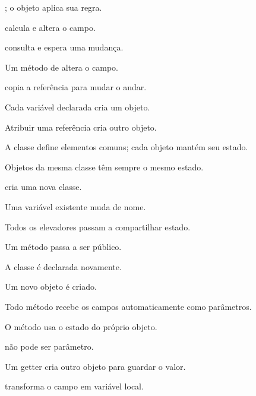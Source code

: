 \documentclass[11pt,a4paper]{article}
\begin{document}
\begin{minipage}[t]{.485\textwidth}
\begin{alternativas}
\item {}; o objeto aplica sua regra.
\item {} calcula e altera o campo.
\item {} consulta e espera uma mudança.
\item Um método de  altera o campo.
\item {} copia a referência para mudar o andar.
\end{alternativas}
\begin{alternativas}
\item Cada variável declarada cria um objeto.
\item Atribuir uma referência cria outro objeto.
\item A classe define elementos comuns; cada objeto mantém seu estado.
\item Objetos da mesma classe têm sempre o mesmo estado.
\item {} cria uma nova classe.
\end{alternativas}
\begin{alternativas}
\item Uma variável existente muda de nome. \item Todos os elevadores passam a compartilhar estado.
\item Um método passa a ser público. \item A classe é declarada novamente.
\item Um novo objeto  é criado.
\end{alternativas}
\begin{alternativas}
\item Todo método recebe os campos automaticamente como parâmetros.
\item O método usa o estado do próprio objeto.
\item {} não pode ser parâmetro.
\item Um getter cria outro objeto para guardar o valor.
\item {} transforma o campo em variável local.
\end{alternativas}
\end{minipage}
\end{document}
